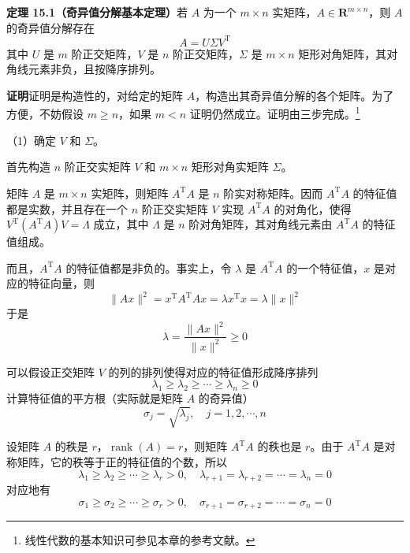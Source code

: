 \documentclass[UTF8, 12pt, fontset=fandol, oneside]{ctexart}
\begin{document}
\noindent\textbf{定理 15.1（奇异值分解基本定理）}\quad 若 $A$ 为一个 $m\times n$ 实矩阵，$A\in\mathbf{R}^{m\times n}$，则 $A$ 的奇异值分解存在
\begin{equation}
A=U\Sigma V^{\mathrm{T}}
\tag{15.2}
\end{equation}
其中 $U$ 是 $m$ 阶正交矩阵，$V$ 是 $n$ 阶正交矩阵，$\Sigma$ 是 $m\times n$ 矩形对角矩阵，其对角线元素非负，且按降序排列。

\noindent\textbf{证明}\quad 证明是构造性的，对给定的矩阵 $A$，构造出其奇异值分解的各个矩阵。为了方便，不妨假设 $m\geqslant n$，如果 $m<n$ 证明仍然成立。证明由三步完成。\footnote{线性代数的基本知识可参见本章的参考文献。}

（1）确定 $V$ 和 $\Sigma$。

首先构造 $n$ 阶正交实矩阵 $V$ 和 $m\times n$ 矩形对角实矩阵 $\Sigma$。

矩阵 $A$ 是 $m\times n$ 实矩阵，则矩阵 $A^{\mathrm{T}}A$ 是 $n$ 阶实对称矩阵。因而 $A^{\mathrm{T}}A$ 的特征值都是实数，并且存在一个 $n$ 阶正交实矩阵 $V$ 实现 $A^{\mathrm{T}}A$ 的对角化，使得 $V^{\mathrm{T}}(A^{\mathrm{T}}A)V=\Lambda$ 成立，其中 $\Lambda$ 是 $n$ 阶对角矩阵，其对角线元素由 $A^{\mathrm{T}}A$ 的特征值组成。

而且，$A^{\mathrm{T}}A$ 的特征值都是非负的。事实上，令 $\lambda$ 是 $A^{\mathrm{T}}A$ 的一个特征值，$x$ 是对应的特征向量，则
\[
\|Ax\|^2=x^{\mathrm{T}}A^{\mathrm{T}}Ax=\lambda x^{\mathrm{T}}x=\lambda\|x\|^2
\]
于是
\begin{equation}
\lambda=\frac{\|Ax\|^2}{\|x\|^2}\geqslant0
\tag{15.3}
\end{equation}

可以假设正交矩阵 $V$ 的列的排列使得对应的特征值形成降序排列
\[
\lambda_1\geqslant\lambda_2\geqslant\cdots\geqslant\lambda_n\geqslant0
\]
计算特征值的平方根（实际就是矩阵 $A$ 的奇异值）
\[
\sigma_j=\sqrt{\lambda_j},\quad j=1,2,\cdots,n
\]

设矩阵 $A$ 的秩是 $r$，$\operatorname{rank}(A)=r$，则矩阵 $A^{\mathrm{T}}A$ 的秩也是 $r$。由于 $A^{\mathrm{T}}A$ 是对称矩阵，它的秩等于正的特征值的个数，所以
\begin{equation}
\lambda_1\geqslant\lambda_2\geqslant\cdots\geqslant\lambda_r>0,\quad
\lambda_{r+1}=\lambda_{r+2}=\cdots=\lambda_n=0
\tag{15.4}
\end{equation}
对应地有
\begin{equation}
\sigma_1\geqslant\sigma_2\geqslant\cdots\geqslant\sigma_r>0,\quad
\sigma_{r+1}=\sigma_{r+2}=\cdots=\sigma_n=0
\tag{15.5}
\end{equation}
\end{document}

